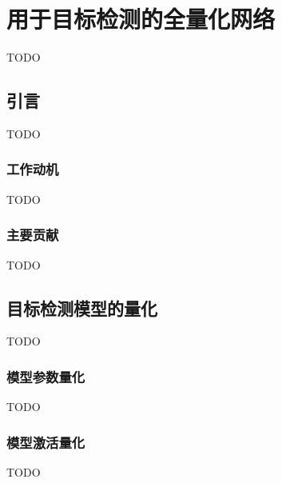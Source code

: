 \chapter{用于目标检测的全量化网络}
TODO

\section{引言}
TODO
\subsection{工作动机}
TODO
\subsection{主要贡献}
TODO

\section{目标检测模型的量化}
TODO
\subsection{模型参数量化}
TODO
\subsection{模型激活量化}
TODO
